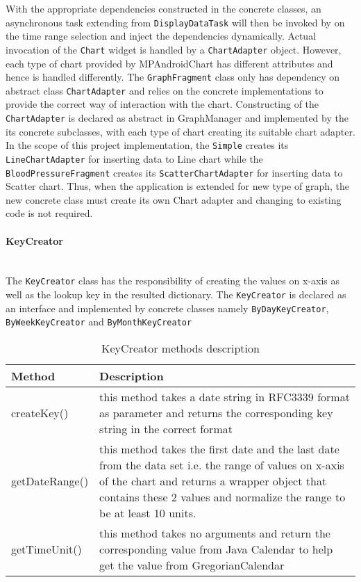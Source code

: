 With the appropriate dependencies constructed in the concrete classes, an asynchronous task extending from
\texttt{DisplayDataTask} will then be invoked by on the time range selection and inject the dependencies dynamically.
Actual invocation of the \texttt{Chart} widget is handled by a \texttt{ChartAdapter} object. However, each type of
chart provided by MPAndroidChart has different attributes and hence is handled differently. The \texttt{GraphFragment}
class only has dependency on abstract class \texttt{ChartAdapter} and relies on the concrete implementations to provide
the correct way of interaction with the chart. Constructing of the \texttt{ChartAdapter} is declared as abstract in
GraphManager and implemented by the its concrete subclasses, with each type of chart creating its suitable chart
adapter. In the scope of this project implementation, the \texttt{Simple} creates its \texttt{LineChartAdapter} for
inserting data to Line chart while the \texttt{BloodPressureFragment} creates its \texttt{ScatterChartAdapter} for
inserting data to Scatter chart. Thus, when the application is extended for new type of graph, the new concrete class
must create its own Chart adapter and changing to existing code is not required.

\paragraph{KeyCreator}\mbox{} \\
The \texttt{KeyCreator} class has the responsibility of creating the values on x-axis as well as the lookup key in the
resulted dictionary. The \texttt{KeyCreator} is declared as an interface and implemented by concrete classes namely
\texttt{ByDayKeyCreator}, \texttt{ByWeekKeyCreator} and \texttt{ByMonthKeyCreator}

\begin{table}
\begin{center}
    \begin{tabularx}{\textwidth}{| l | X |}
        \hline Method & Description \\
        \hline createKey() & 
            this method takes a date string in RFC3339 format as parameter and returns the corresponding key string in
            the correct format \\
        \hline getDateRange() &
            this method takes the first date and the last date from the data set i.e. the range of values on x-axis of
            the chart and returns a wrapper object that contains these 2 values and normalize the range to be at least
            10 units. \\
        \hline getTimeUnit() &
            this method takes no arguments and return the corresponding value from Java Calendar to help get the value
            from GregorianCalendar \\
        \hline
    \end{tabularx}
\end{center}
    \caption{KeyCreator methods description}
\end{table}

